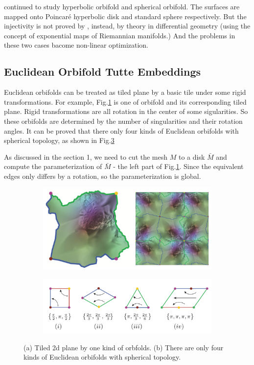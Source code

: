 \documentclass[fleqn,10pt]{wlscirep}
\begin{document}
\cite{Aigerman:2016:HOT:2980179.2982412}\cite{Aigerman:2016:HOT:2980179.2982412} continued to study hyperbolic orbifold and spherical orbifold. The surfaces are mapped onto Poincar\'e hyperbolic disk and standard sphere respectively. But the injectivity is not proved by \cite{Gortler:2006:DOM:1133946.1648437}, instead, by theory in differential geometry (using the concept of exponential maps of Riemannian manifolds.)
And the problems in these two cases bacome non-linear optimization.

\subsection{Euclidean Orbifold Tutte Embeddings}

Euclidean orbifolds can be treated as tiled plane by a basic tile under some rigid transformations.
For example, Fig.\ref{fig:tile} is one of orbifold and its corresponding tiled plane. Rigid transformations are all rotation in the center of some sigularities. So these orbifolds are determined by the number of singularities and their rotation angles. It can be proved that there only four kinds of Euclidean orbifolds with spherical topology, as shown in Fig.\ref{fig:four-kinds}

As discussed in the section 1, we need to cut the mesh  $M$ to a disk $\bar{M}$ and compute the parameterization of $\bar{M}$ - the left part of Fig.\ref{fig:tile}. Since the equivalent edges only differs  by a rotation, so the parameterization is global.
\begin{figure}
\centering
\begin{subfigure}[b]{0.3\textwidth}
\includegraphics[width=\textwidth]{images/euc_orbifold}
\caption{}
\label{fig:tile}
\end{subfigure}
\begin{subfigure}[b]{0.5\textwidth}
\includegraphics[width=\textwidth]{images/four_euc_orbifolds}
\caption{}
\label{fig:four-kinds}
\end{subfigure}
\caption{(a) Tiled 2d plane by one kind of orbfolds. (b) There are only four kinds of Euclidean orbifolds with spherical topology.}
\end{figure}
\end{document}
